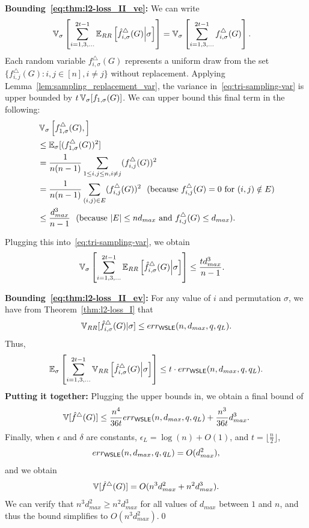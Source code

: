 \noindent\textbf{Bounding~\eqref{eq:thm:l2-loss_II_ve}:}
We can write
\begin{align}
  \operatorname{\mathbb{V}}_\sigma\left[\sum_{i = 1, 3, \ldots}^{2t-1} \operatorname{\mathbb{E}}_{RR}\left[\hat{f}_{i,\sigma}^\triangle(G)\middle|\sigma \right]\right]
    &= \operatorname{\mathbb{V}}_\sigma\left[\sum_{i = 1, 3, \ldots}^{2t-1}
    f_{i,\sigma}^\triangle(G)\right]. \label{eq:tri-sampling-var}
\end{align}
Each random variable $f_{i,\sigma}^\triangle(G)$ represents a uniform draw from the set
$\{f_{i,j}^\triangle(G) : i,j \in [n], i \neq j\}$ without replacement. Applying
Lemma~\ref{lem:sampling_replacement_var}, the variance
in~\eqref{eq:tri-sampling-var} is upper bounded by
$t \operatorname{\mathbb{V}}_\sigma[f_{1,\sigma}(G)]$. We can upper bound this final term
in the following:
\begin{align}
&\operatorname{\mathbb{V}}_\sigma\left[f_{1,\sigma}^\triangle(G), \right] \nonumber\\
&\leq \operatorname{\mathbb{E}}_\sigma[(f_{1,\sigma}^\triangle(G))^2] \nonumber\\
&= \frac{1}{n(n-1)} \sum_{1 \leq i, j \leq n, i \neq j} (f_{i,j}^\triangle(G))^2
\nonumber\\
&= \frac{1}{n(n-1)} \sum_{(i,j) \in E} (f_{i,j}^\triangle(G))^2 ~~ \text{(because $f_{i,j}^\triangle(G) = 0$ for $(i,j) \notin E$)} \nonumber\\
&\leq \frac{d_{max}^3}{n-1} ~~ \text{(because $|E| \leq n d_{max}$ and $f_{i,j}^\triangle(G) \leq d_{max}$)}.
\label{eq:thm:DP_II_cov_sigma_eq}
\end{align}

Plugging this into~\eqref{eq:tri-sampling-var}, we obtain
\begin{align*}
  \operatorname{\mathbb{V}}_\sigma\left[\sum_{i = 1, 3, \ldots}^{2t-1}
    \operatorname{\mathbb{E}}_{RR}\left[\hat{f}_{i,\sigma}^\triangle(G)\middle|\sigma \right]\right]
    &\leq \frac{td_{max}^3}{n-1}.
\end{align*}

\noindent\textbf{Bounding~\eqref{eq:thm:l2-loss_II_ev}:}
For any value of $i$ and permutation $\sigma$, we have
from Theorem~\ref{thm:l2-loss_I} that
\[
  \operatorname{\mathbb{V}}_{RR}[\hat{f}_{i,\sigma}^\triangle(G)|\sigma] \leq
  err_{\textsf{WSLE}{}}(n,d_{max}, q, q_L).
\]
Thus,
\[
  \operatorname{\mathbb{E}}_\sigma\left[\sum_{i = 1, 3, \ldots}^{2t-1}
    \operatorname{\mathbb{V}}_{RR}\left[\hat{f}_{i,\sigma}^\triangle(G)\middle|\sigma \right]\right]
    \leq t \cdot err_{\textsf{WSLE}{}}(n,d_{max}, q, q_L).
\]
\noindent\textbf{Putting it together:}
Plugging the upper bounds in, we obtain a
final bound of
\[
  \V[\hf^\triangle(G)] \leq
  \frac{n^4}{36t}err_{\AlgWSLE{}}(n,d_{max},q,q_L) +
  \frac{n^3}{36t}d_{max}^3. %
\]
Finally, when $\epsilon$ and $\delta$ are constants, $\epsilon_L = \log(n) + O(1)$, and $t = \lfloor\frac{n}{2}\rfloor$,
\[err_{\textsf{WSLE}{}}(n,d_{max},q,q_L) = O(d_{max}^2),\] and we obtain
\[
  \operatorname{\mathbb{V}}[\hat{f}^\triangle(G)] = O(n^3d_{max}^2 + n^2d_{max}^3).
\]
We can verify that $n^3d_{max}^2 \geq n^2d_{max}^3$ for all values of $d_{max}$
between $1$ and $n$, and thus the bound simplifies to $O(n^3 d_{max}^2)$.\qed

